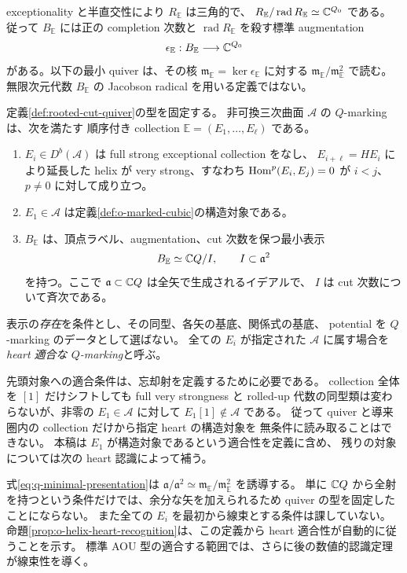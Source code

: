 exceptionality と半直交性により $R_{\mathbb E}$ は三角的で、
$R_{\mathbb E}/\operatorname{rad}R_{\mathbb E}\simeq\mathbb C^{Q_0}$ である。
従って $B_{\mathbb E}$ には正の completion 次数と
$\operatorname{rad}R_{\mathbb E}$ を殺す標準 augmentation
\[
 \epsilon_{\mathbb E}:B_{\mathbb E}\longrightarrow\mathbb C^{Q_0}
\]
がある。以下の最小 quiver は、その核
$\mathfrak m_{\mathbb E}=\ker\epsilon_{\mathbb E}$ に対する
$\mathfrak m_{\mathbb E}/\mathfrak m_{\mathbb E}^2$ で読む。
無限次元代数 $B_{\mathbb E}$ の Jacobson radical を用いる定義ではない。

\begin{definition}[$Q$-marking]\label{def:q-marking}
定義\ref{def:rooted-cut-quiver}の型を固定する。
非可換三次曲面 $\mathcal A$ の $Q$-marking は、次を満たす
順序付き collection $\mathbb E=(E_1,\ldots,E_\ell)$ である。
\begin{enumerate}
 \item $E_i\in D^b(\mathcal A)$ は full strong exceptional collection をなし、
 $E_{i+\ell}=HE_i$ により延長した helix が very strong、すなわち
 $\operatorname{Hom}^p(E_i,E_j)=0$ が $i<j$、$p\ne0$ に対して成り立つ。
 \item $E_1\in\mathcal A$ は定義\ref{def:o-marked-cubic}の構造対象である。
 \item $B_{\mathbb E}$ は、頂点ラベル、augmentation、cut 次数を保つ最小表示
 \begin{equation}\label{eq:q-minimal-presentation}
  B_{\mathbb E}\simeq\mathbb C Q/I,\qquad I\subset\mathfrak a^2
 \end{equation}
 を持つ。ここで $\mathfrak a\subset\mathbb C Q$ は全矢で生成されるイデアルで、
 $I$ は cut 次数について斉次である。
\end{enumerate}
表示の\emph{存在}を条件とし、その同型、各矢の基底、関係式の基底、
potential を $Q$-marking のデータとして選ばない。
全ての $E_i$ が指定された $\mathcal A$ に属す場合を
\emph{heart 適合な $Q$-marking}と呼ぶ。
\end{definition}

先頭対象への適合条件は、忘却射を定義するために必要である。
collection 全体を $[1]$ だけシフトしても full very strongness と
rolled-up 代数の同型類は変わらないが、非零の $E_1\in\mathcal A$ に対して
$E_1[1]\notin\mathcal A$ である。
従って quiver と導来圏内の collection だけから指定 heart の構造対象を
無条件に読み取ることはできない。
本稿は $E_1$ が構造対象であるという適合性を定義に含め、
残りの対象については次の heart 認識によって補う。

式\eqref{eq:q-minimal-presentation}は
$\mathfrak a/\mathfrak a^2\simeq
\mathfrak m_{\mathbb E}/\mathfrak m_{\mathbb E}^2$ を誘導する。
単に $\mathbb C Q$ から全射を持つという条件だけでは、余分な矢を加えられるため
quiver の型を固定したことにならない。
また全ての $E_i$ を最初から線束とする条件は課していない。
命題\ref{prop:o-helix-heart-recognition}は、この定義から
heart 適合性が自動的に従うことを示す。
標準 AOU 型の適合する範囲では、さらに後の数値的認識定理が線束性を導く。

